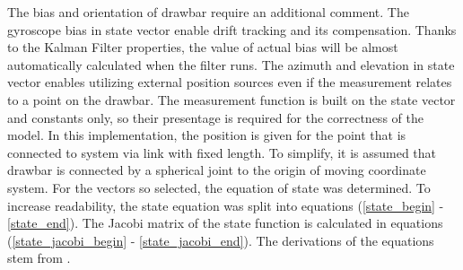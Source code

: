 The bias and orientation of drawbar require an additional comment. The gyroscope bias in state vector enable drift tracking and its compensation. Thanks to the Kalman Filter properties, the value of actual bias will be almost automatically calculated when the filter runs. The azimuth and elevation in state vector enables utilizing external position sources even if the measurement relates to a point on the drawbar. The measurement function is built on the state vector and constants only, so their presentage is required for the correctness of the model. In this implementation, the position is given for the point that is connected to system via link with fixed length. To simplify, it is assumed that drawbar is connected by a spherical joint to the origin of moving coordinate system. For the vectors so selected, the equation of state was determined. To increase readability, the state equation was split into equations (\ref{state_begin} - \ref{state_end}). The Jacobi matrix of the state function is calculated in equations (\ref{state_jacobi_begin} - \ref{state_jacobi_end}).  The derivations of the equations stem from \cite{ekf_poor}.

